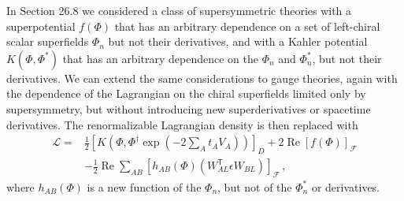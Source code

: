 In Section 26.8 we considered a class of supersymmetric theories with a
superpotential \(f(\Phi)\) that has an arbitrary dependence on a set of
left-chiral scalar superfields \(\Phi_n\) but not their derivatives, and with
a Kahler potential \(K(\Phi,\Phi^*)\) that has an arbitrary dependence on the
\(\Phi_n\) and \(\Phi_n^*\), but not their derivatives. We can extend the
same considerations to gauge theories, again with the dependence of the
Lagrangian on the chiral superfields limited only by supersymmetry, but
without introducing new superderivatives or spacetime derivatives. The
renormalizable Lagrangian density is then replaced with
\begin{equation}
  \begin{aligned}
  \mathcal{L}={}&
  \frac12\left[
    K\left(
      \Phi,\Phi^\dagger
      \exp\left(-2\sum_A t_AV_A\right)
    \right)
  \right]_D
  +2\operatorname{Re}[f(\Phi)]_{\mathcal{F}}
  \\
  &-\frac12\operatorname{Re}\sum_{AB}
  \left[
    h_{AB}(\Phi)
    \left(W_{AL}^{\mathsf T}\epsilon W_{BL}\right)
  \right]_{\mathcal{F}}\,,
  \end{aligned}
  \tag{27.4.41}\label{eq:27.4.41}
\end{equation}
where \(h_{AB}(\Phi)\) is a new function of the \(\Phi_n\), but not of the
\(\Phi_n^*\) or derivatives.

